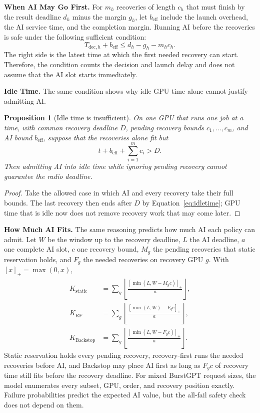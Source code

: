 \documentclass[acmsmall,screen,review,anonymous]{acmart}
\newcommand{\sys}{Backstop\xspace}
\newtheorem{proposition}{Proposition}
\begin{document}
\noindent\textbf{When AI May Go First.}
For $m_h$ recoveries of length $c_h$ that must finish by the result deadline $d_h$ minus the margin
$g_h$, let $b_{\mathrm{eff}}$ include the launch overhead, the AI service time, and the completion
margin. Running AI before the recoveries is safe under the following sufficient condition:
\begin{equation}
 T_{\mathrm{dec},h}+b_{\mathrm{eff}}
 \le d_h-g_h-m_hc_h. \label{eq:window}
\end{equation}
The right side is the latest time at which the first needed recovery can start. Therefore, the
condition counts the decision and launch delay and does not assume that the AI slot starts immediately.

\noindent\textbf{Idle Time.}
The same condition shows why idle GPU time alone cannot justify admitting AI.
\begin{proposition}[Idle time is insufficient]
\label{prop:idletime}
On one GPU that runs one job at a time, with common recovery deadline $D$, pending recovery bounds
$c_1,\ldots,c_m$, and AI bound $b_{\mathrm{eff}}$, suppose that the recoveries alone fit but
\begin{equation}
  t+b_{\mathrm{eff}}+\sum_{i=1}^{m}c_i>D. \label{eq:idletime}
\end{equation}
Then admitting AI into idle time while ignoring pending recovery cannot guarantee the radio deadline.
\end{proposition}
\begin{proof}
Take the allowed case in which AI and every recovery take their full bounds. The last recovery then ends
after $D$ by Equation~\ref{eq:idletime}; GPU time that is idle now does not remove recovery work that may
come later.
\end{proof}

\noindent\textbf{How Much AI Fits.}
The same reasoning predicts how much AI each policy can admit. Let $W$ be the window up to the recovery
deadline, $L$ the AI deadline, $a$ one complete AI slot, $c$ one recovery bound, $M_g$ the pending
recoveries that static reservation holds, and $F_g$ the needed recoveries on recovery GPU $g$. With
$[x]_+=\max(0,x)$,
\begin{align}
 K_{\mathrm{static}}&=\sum_g\left\lfloor\frac{[\min(L,W-M_gc)]_+}{a}\right\rfloor,\\
 K_{\mathrm{RF}}&=\sum_g\left\lfloor\frac{[\min(L,W)-F_gc]_+}{a}\right\rfloor,\\
 K_{\text{\sys}}&=\sum_g\left\lfloor\frac{[\min(L,W-F_gc)]_+}{a}\right\rfloor. \label{eq:capacity}
\end{align}
Static reservation holds every pending recovery, recovery-first runs the needed recoveries before AI,
and \sys may place AI first as long as $F_gc$ of recovery time still fits before the recovery deadline.
For mixed BurstGPT request sizes, the model enumerates every subset, GPU, order, and recovery position
exactly. Failure probabilities predict the expected AI value, but the all-fail safety check does not
depend on them.
\end{document}
